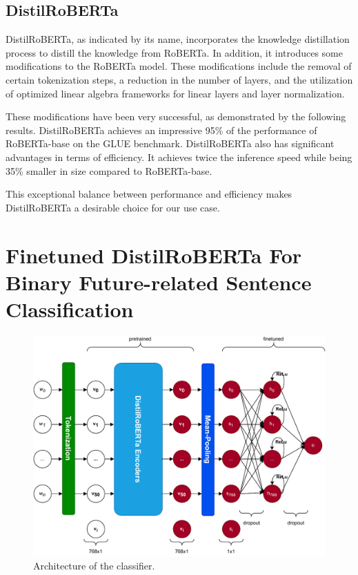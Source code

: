 \documentclass[a4paper,10pt]{report}
\begin{document}
\subsection{DistilRoBERTa} %
DistilRoBERTa, as indicated by its name, incorporates the knowledge distillation process to distill the knowledge from RoBERTa. In addition, it introduces some modifications to the RoBERTa model. These modifications include the removal of certain tokenization steps, a reduction in the number of layers, and the utilization of optimized linear algebra frameworks for linear layers and layer normalization.

These modifications have been very successful, as demonstrated by the following results. DistilRoBERTa achieves an impressive 95\% of the performance of RoBERTa-base on the GLUE benchmark. DistilRoBERTa also has significant advantages in terms of efficiency. It achieves twice the inference speed while being 35\% smaller in size compared to RoBERTa-base. 

This exceptional balance between performance and efficiency makes DistilRoBERTa a desirable choice for our use case. \cite{distilbert}

\section{Finetuned DistilRoBERTa For Binary Future-related Sentence Classification}
\begin{figure}
  \centering
  \includegraphics[width=15cm]{img/classifier_archi.pdf}
  \caption{Architecture of the classifier.}
  \label{fig:classifier_archi}
\end{figure}
\end{document}
